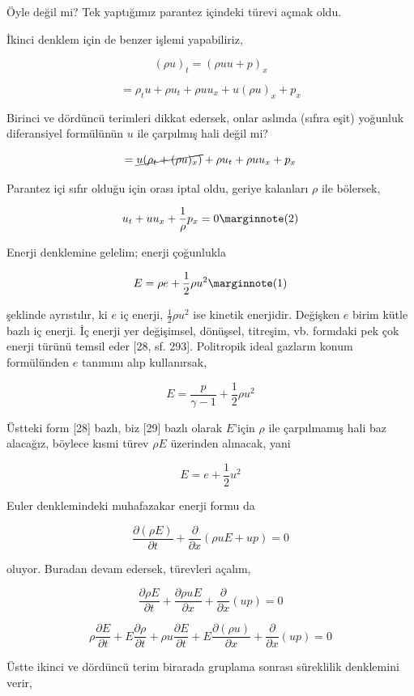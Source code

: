 \documentclass[12pt,fleqn]{article}\usepackage{../../common}
\begin{document}
Öyle değil mi? Tek yaptığımız parantez içindeki türevi açmak oldu. 

İkinci denklem için de benzer işlemi yapabiliriz,

$$
(\rho u)_t = (\rho uu + p)_x
$$

$$
= \rho_t u + \rho u_t + \rho u u_x + u (\rho u)_x + p_x
$$

Birinci ve dördüncü terimleri dikkat edersek, onlar aslında (sıfıra eşit)
yoğunluk diferansiyel formülünün $u$ ile çarpılmış hali değil mi?

$$
= \cancel{u (\rho_t + (\rho u)_x )} + \rho u_t + \rho u u_x + p_x
$$

Parantez içi sıfır olduğu için orası iptal oldu, geriye kalanları $\rho$
ile bölersek,

$$
u_t + u u_x + \frac{1}{\rho} p_x = 0
\mlabel{2}
$$

Enerji
denklemine gelelim; enerji çoğunlukla

$$
E = \rho e + \frac{1}{2} \rho u^2
\mlabel{1}
$$

şeklinde ayrıstılır, ki $e$ iç enerji, $\frac{1}{2}\rho u^2$ ise kinetik
enerjidir. Değişken $e$ birim kütle bazlı iç enerji. İç enerji yer değişimsel,
dönüşsel, titreşim, vb. formdaki pek çok enerji türünü temsil eder [28, sf. 293].
Politropik ideal gazların konum formülünden $e$ tanımını alıp kullanırsak,

$$
E = \frac{p}{\gamma - 1} + \frac{1}{2} \rho u^2
$$

Üstteki form [28] bazlı, biz [29] bazlı olarak $E$'için $\rho$ ile çarpılmamış
hali baz alacağız, böylece kısmi türev $\rho E$ üzerinden alınacak, yani

$$
E = e + \frac{1}{2} u^2
$$

Euler denklemindeki muhafazakar enerji formu da

$$
\frac{\partial (\rho E)}{\partial t} + \frac{\partial }{\partial x} (\rho u E + up) = 0
$$

oluyor. Buradan devam edersek, türevleri açalım,

$$
\frac{\partial \rho E}{\partial t} + \frac{\partial \rho u E}{\partial x} +
\frac{\partial }{\partial x} (up) = 0
$$

$$
\rho \frac{\partial E}{\partial t} + E \frac{\partial \rho}{\partial t} +
\rho u \frac{\partial E}{\partial t} + E \frac{\partial (\rho u)}{\partial x} +
\frac{\partial }{\partial x} (up) = 0
$$

Üstte ikinci ve dördüncü terim birarada gruplama sonrası süreklilik denklemini
verir,
\end{document}
